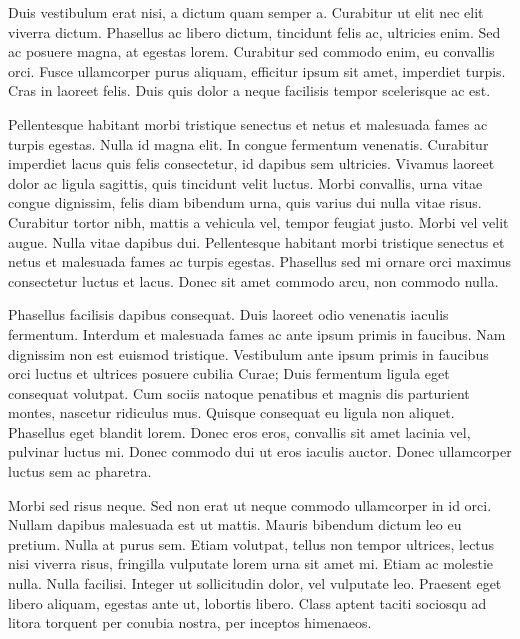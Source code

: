 \documentclass[12pt, letterpaper,twocolumn]{article}
\begin{document}
Duis vestibulum erat nisi, a dictum quam semper a. Curabitur ut elit nec elit viverra dictum. Phasellus ac libero dictum, tincidunt felis ac, ultricies enim. Sed ac posuere magna, at egestas lorem. Curabitur sed commodo enim, eu convallis orci. Fusce ullamcorper purus aliquam, efficitur ipsum sit amet, imperdiet turpis. Cras in laoreet felis. Duis quis dolor a neque facilisis tempor scelerisque ac est.

Pellentesque habitant morbi tristique senectus et netus et malesuada fames ac turpis egestas. Nulla id magna elit. In congue fermentum venenatis. Curabitur imperdiet lacus quis felis consectetur, id dapibus sem ultricies. Vivamus laoreet dolor ac ligula sagittis, quis tincidunt velit luctus. Morbi convallis, urna vitae congue dignissim, felis diam bibendum urna, quis varius dui nulla vitae risus. Curabitur tortor nibh, mattis a vehicula vel, tempor feugiat justo. Morbi vel velit augue. Nulla vitae dapibus dui. Pellentesque habitant morbi tristique senectus et netus et malesuada fames ac turpis egestas. Phasellus sed mi ornare orci maximus consectetur luctus et lacus. Donec sit amet commodo arcu, non commodo nulla.

Phasellus facilisis dapibus consequat. Duis laoreet odio venenatis iaculis fermentum. Interdum et malesuada fames ac ante ipsum primis in faucibus. Nam dignissim non est euismod tristique. Vestibulum ante ipsum primis in faucibus orci luctus et ultrices posuere cubilia Curae; Duis fermentum ligula eget consequat volutpat. Cum sociis natoque penatibus et magnis dis parturient montes, nascetur ridiculus mus. Quisque consequat eu ligula non aliquet. Phasellus eget blandit lorem. Donec eros eros, convallis sit amet lacinia vel, pulvinar luctus mi. Donec commodo dui ut eros iaculis auctor. Donec ullamcorper luctus sem ac pharetra.

Morbi sed risus neque. Sed non erat ut neque commodo ullamcorper in id orci. Nullam dapibus malesuada est ut mattis. Mauris bibendum dictum leo eu pretium. Nulla at purus sem. Etiam volutpat, tellus non tempor ultrices, lectus nisi viverra risus, fringilla vulputate lorem urna sit amet mi. Etiam ac molestie nulla. Nulla facilisi. Integer ut sollicitudin dolor, vel vulputate leo. Praesent eget libero aliquam, egestas ante ut, lobortis libero. Class aptent taciti sociosqu ad litora torquent per conubia nostra, per inceptos himenaeos.
\end{document}

